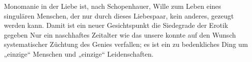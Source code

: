 Monomanie in der Liebe ist, nach Schopenhauer, Wille zum Leben eines singulären Menschen, der nur durch dieses Liebespaar, kein anderes, gezeugt werden kann. Damit ist ein neuer Gesichtspunkt die Siedegrade der Erotik gegeben Nur ein naschhaftes Zeitalter wie das unsere konnte auf den Wunsch systematischer Züchtung des Genies verfallen; es ist ein zu bedenkliches Ding um „einzige“ Menschen und „einzige“ Leidenschaften.
\par

